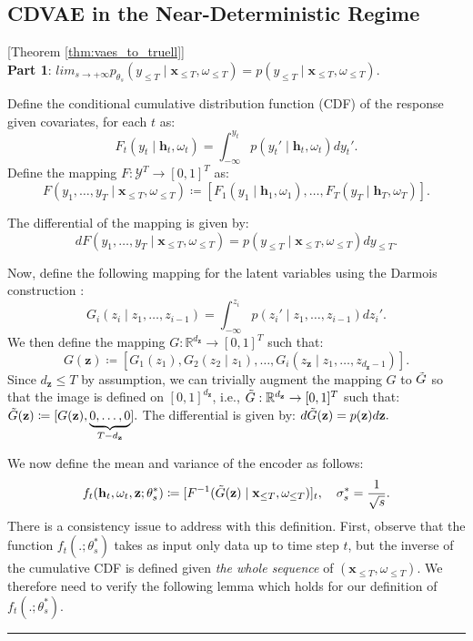 \documentclass[10pt]{article} %
\newcommand{\BlackBox}{\rule{1.5ex}{1.5ex}}  %
\renewenvironment{proof}{\par\noindent{\bf Proof\ }}{\hfill\BlackBox\\[2mm]}
\newenvironment{proof}{\par\noindent{\bf Proof\ }}{\hfill\BlackBox\\[2mm]}
\begin{document}
\subsection{CDVAE in the Near-Deterministic Regime}
\label{appendix:proof_cdvae_near_det}
\begin{proof}[Theorem \ref{thm:vaes_to_truell}] \\
\textbf{Part 1}: $lim_{s \to + \infty} p_{\theta_s}(y_{\leq T} \mid \mathbf{x}_{\leq T}, \omega_{\leq T}) = p(y_{\leq T} \mid \mathbf{x}_{\leq T}, \omega_{\leq T})$.

Define the conditional cumulative distribution function (CDF) of the response given covariates, for each $t$ as:
\[
F_t(y_t \mid \mathbf{h}_t, \omega_t) = \int_{- \infty}^{y_t} p(y_t' \mid \mathbf{h}_t, \omega_t ) dy_t'.
\]
Define the mapping \( F: \mathcal{Y}^{T} \to [0,1]^T \) as:
\[
F(y_1, \dots, y_T \mid \mathbf{x}_{\leq T}, \omega_{\leq T}) \coloneqq \left[F_1(y_1 \mid \mathbf{h}_1, \omega_1), \dots, F_T(y_T \mid \mathbf{h}_T, \omega_T)\right].
\]

The differential of the mapping is given by:
\[
dF(y_1, \dots, y_T \mid \mathbf{x}_{\leq T}, \omega_{\leq T}) = p(y_{\leq T} \mid \mathbf{x}_{\leq T}, \omega_{\leq T}) dy_{\leq T}.
\]

Now, define the following mapping for the latent variables using the Darmois construction \citep{hyvarinen1999nonlinear}:
\[
G_i(z_i \mid z_1, \dots, z_{i-1}) = \int_{- \infty}^{z_i} p(z_i' \mid z_1, \dots, z_{i-1}) dz_i'.
\]
We then define the mapping \( G: \mathbb{R}^{d_{\mathbf{z}}} \to [0,1]^T \) such that:
\[
G(\mathbf{z}) \coloneqq [G_1(z_1), G_2(z_2 \mid z_1), \dots, G_i(z_{\mathbf{z}} \mid z_1, \dots, z_{d_{\mathbf{z}}-1})].
\]
Since $d_{\mathbf{z}} \leq T$ by assumption, we can trivially augment the mapping $G$ to $\Tilde{G}$ so that the image is defined on $[0,1]^{d_{\mathbf{z}}}$, i.e., \( \Tilde{G}: \mathbb{R}^{d_{\mathbf{z}}} \to [0,1]^T \) such that:
\(
\Tilde{G}(\mathbf{z}) \coloneqq [G(\mathbf{z}), \underbrace{0, \dots, 0}_{T - d_{\mathbf{z}}}].
\) The differential is given by: \(
d\Tilde{G}(\mathbf{z}) = p(\mathbf{z}) d\mathbf{z}.
\)

We now define the mean and variance of the encoder as follows:
\[
f_t(\mathbf{h}_t, \omega_t, \mathbf{z}; \theta_{s}^*) \coloneqq [F^{-1}(\Tilde{G}(\mathbf{z}) \mid \mathbf{x}_{\leq T}, \omega_{\leq T})]_t, \quad \sigma_{s}^* = \frac{1}{\sqrt{s}}.
\]
There is a consistency issue to address with this definition. First, observe that the function $f_t(.; \theta_{s}^*)$ takes as input only data up to time step $t$, but the inverse of the cumulative CDF is defined given \textit{the whole sequence} of $(\mathbf{x}_{\leq T}, \omega_{\leq T})$. We therefore need to verify the following lemma which holds for our definition of $f_t(.; \theta_{s}^*)$.


\end{proof}
\end{document}
